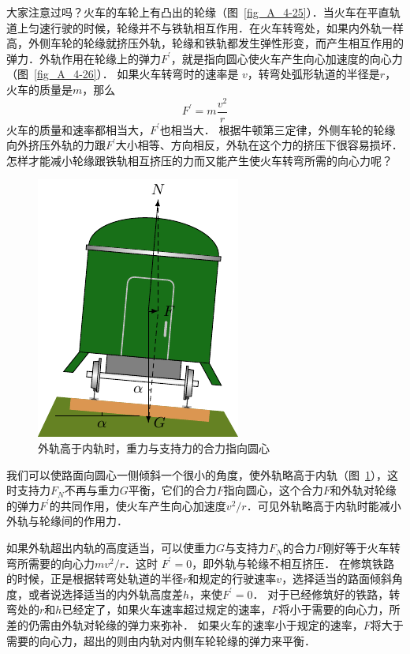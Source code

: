大家注意过吗？火车的车轮上有凸出的轮缘（图~\ref{fig_A_4-25}）．当火车在平直轨道上匀速行驶的时候，轮缘并不与铁轨相互作用．在火车转弯处，如果内外轨一样高，外侧车轮的轮缘就挤压外轨，轮缘和铁轨都发生弹性形变，而产生相互作用的弹力．外轨作用在轮缘上的弹力$F^{\prime}$，就是指向圆心使火车产生向心加速度的向心力（图~\ref{fig_A_4-26}）．
如果火车转弯时的速率是
$v$，转弯处弧形轨道的半径是$r$，火车的质量是$m$，那么
\[F^{\prime}=m\frac{v^2}{r} \]
火车的质量和速率都相当大，$F^{\prime}$也相当大．
根据牛顿第三定律，外侧车轮的轮缘向外挤压外轨的力跟$F^{\prime}$大小相等、方向相反，外轨在这个力的挤压下很容易损坏．
怎样才能减小轮缘跟铁轨相互挤压的力而又能产生使火车转弯所需的向心力呢？
\begin{figure}[htbp]
    \centering
    \includegraphics{fig/A/4-27.pdf}
    \caption{外轨高于内轨时，重力与支持力的合力指向圆心}\label{fig_A_4-27}
\end{figure}

我们可以使路面向圆心一侧倾斜一个很小的角度，使外轨略高于内轨（图~\ref{fig_A_4-27}），这时支持力$F_N$不再与重力$G$平衡，它们的合力$F$指向圆心，这个合力$F$和外轨对轮缘的弹力$F^{\prime}$的共同作用，使火车产生向心加速度$v^2/r$．可见外轨略高于内轨时能减小外轨与轮缘间的作用力．


如果外轨超出内轨的高度适当，可以使重力$G$与支持力$F_N$的合力$F$刚好等于火车转弯所需要的向心力$mv^2/r$．这时
$F^{\prime}=0$，即外轨与轮缘不相互挤压．
在修筑铁路的时候，正是根据转弯处轨道的半径$r$和规定的行驶速率$v$，选择适当的路面倾斜角度，或者说选择适当的内外轨高度差$h$，来使$F^{\prime}=0$．
对于已经修筑好的铁路，转弯处的$r$和$h$已经定了，如果火车速率超过规定的速率，$F$将小于需要的向心力，所差的仍需由外轨对轮缘的弹力来弥补．
如果火车的速率小于规定的速率，$F$将大于需要的向心力，超出的则由内轨对内侧车轮轮缘的弹力来平衡．

